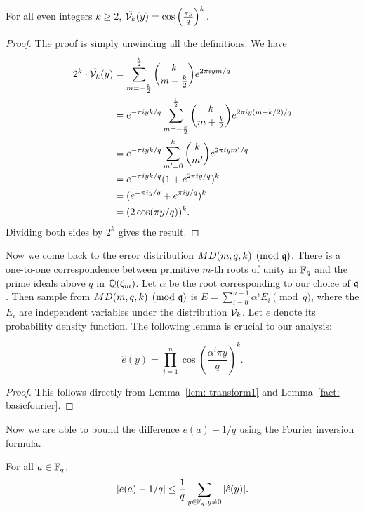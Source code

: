\documentclass{amsart}
\begin{document}
\begin{Lemma}
\label{lem: transform1}
For all even integers $k \geq 2$, $\hat{\mathcal{V}_k}(y)  = \cos \left(\frac{\pi y}{q}\right)^k.$
\end{Lemma}

\begin{proof} The proof is simply unwinding all the definitions. We have
\begin{align*}
2^k \cdot \hat{\mathcal{V}_k}(y) &= \sum_{m = -\frac{k}{2}}^{\frac{k}{2}} {k \choose m+\frac{k}{2}} e^{2\pi i ym/q}  \\
&= e^{-\pi i yk/q}\sum_{m = -\frac{k}{2}}^{\frac{k}{2}} {k \choose m+\frac{k}{2}} e^{2\pi i y(m+k/2)/q} \\
&= e^{-\pi i yk/q} \sum_{m' = 0}^{k} {k \choose m'} e^{2\pi i ym'/q} \\
& =  e^{-\pi i yk/q} (1+ e^{2 \pi i y/q})^k \\
& = (e^{-\pi i y/q} + e^{\pi i y/q})^k  \\
& = (2 \cos(\pi y/q))^k.
\end{align*}
Dividing both sides by $2^k$ gives the result.
\end{proof}


Now we come back to the error distribution $MD(m,q,k) \pmod {\mathfrak{q}}$. There is a one-to-one correspondence between primitive $m$-th roots of unity in $\mathbb{F}_q$ and the prime ideals above $q$ in $\mathbb{Q}(\zeta_m)$. Let $\alpha$ be the root corresponding to our choice of $\mathfrak{q}$. Then sample from $MD(m,q,k) \pmod {\mathfrak{q}}$ is $E = \sum_{i=0}^{n-1} \alpha^i E_i \pmod {q}$, where the $E_i$ are independent variables under the distribution $\mathcal{V}_k$. Let $e$ denote its probability density function. The following lemma is crucial to our analysis:

\begin{Lemma}
\label{lem: transform2}
\[
    \widehat{e}(y) = \prod_{i=1}^{n} \cos \left(\frac{ \alpha^i \pi y}{q} \right)^k.
\]
\end{Lemma}

\begin{proof}
This follows directly from Lemma~\ref{lem: transform1} and Lemma~\ref{fact: basicfourier}.
\end{proof}

Now we are able to bound the difference $e(a) - 1/q$ using the Fourier inversion formula.

\begin{theorem}
For all $a \in \mathbb{F}_q$,
\begin{equation} \label{eq: secure}
    |e(a) -  1/q| \leq \frac{1}{q}  \sum_{y \in \mathbb{F}_q, y \neq 0}  |\hat{e}(y)|.
\end{equation}
\end{theorem}
\end{document}
